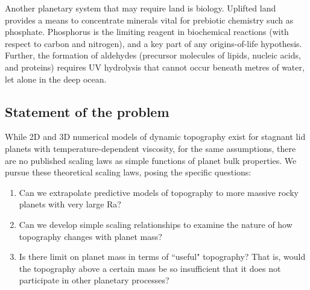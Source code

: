Another planetary system that may require land is biology. Uplifted land provides a means to concentrate minerals vital for prebiotic chemistry such as phosphate. Phosphorus is the limiting reagent in biochemical reactions (with respect to carbon and nitrogen), and a key part of any origins-of-life hypothesis. Further, the formation of aldehydes (precursor molecules of lipids, nucleic acids, and proteins) requires UV hydrolysis that cannot occur beneath metres of water, let alone in the deep ocean.

\subsection{Statement of the problem}

While 2D and 3D numerical models of dynamic topography exist for stagnant lid planets with temperature-dependent viscosity, for the same assumptions, there are no published scaling laws as simple functions of planet bulk properties. We pursue these theoretical scaling laws, posing the specific questions:

\begin{enumerate}
\item Can we extrapolate predictive models of topography to more massive rocky planets with very large Ra?
\item Can we develop simple scaling relationships to examine the nature of how topography changes with planet mass?
\item Is there limit on planet mass in terms of ``useful" topography? That is, would the topography above a certain mass be so insufficient that it does not participate in other planetary processes?
\end{enumerate}





